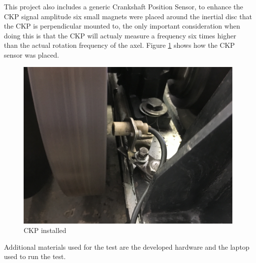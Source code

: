 		This project also includes a generic Crankshaft Position Sensor, to enhance the CKP signal amplitude six small magnets were placed around the inertial disc that the CKP is perpendicular mounted to, the only important consideration when doing this is that the CKP will actualy measure a frequency six times higher than the actual rotation frequency of the axel. Figure \ref{fig:ckp-installed} shows how the CKP sensor was placed.

		\begin{figure}[htbp]
			\centering
			\includegraphics[width=.7\textwidth]{figuras/fig-ckp-installed}
			\caption{CKP installed}
			\label{fig:ckp-installed}
		\end{figure}
		\par

		Additional materials used for the test are the developed hardware and the laptop used to run the test.